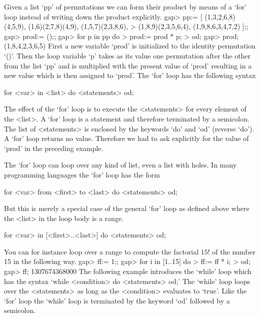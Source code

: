 \null

%
Given a list `pp' of permutations we can form their product by means of a
`for' loop instead of writing down the product explicitly.
\beginexample
    gap> pp:= [ (1,3,2,6,8)(4,5,9), (1,6)(2,7,8)(4,9), (1,5,7)(2,3,8,6),
    >           (1,8,9)(2,3,5,6,4), (1,9,8,6,3,4,7,2) ];;
    gap> prod:= ();;
    gap> for p in pp do
    >       prod:= prod * p;
    >    od;
    gap> prod;
    (1,8,4,2,3,6,5)
\endexample
First a  new variable `prod'  is initialized  to the identity permutation
`()'. Then the loop variable `p' takes as its value one permutation after
the other from the list `pp' and is multiplied with  the present value of
`prod'  resulting in a  new value which  is then assigned  to `prod'. The
`for' loop has the following syntax

\)\fmark for <var> in <list> do <statements> od;

The  effect of the `for'  loop  is to execute the <statements> for  every
element  of  the <list>.   A `for'  loop  is  a  statement  and therefore
terminated by a semicolon.  The list of <statements>  is enclosed by  the
keywords `do' and `od'  (reverse  `do').  A `for'  loop returns no value.
Therefore we had  to  ask  explicitly for  the  value  of  `prod' in  the
preceding example.

The `for' loop can loop over any kind of list, even a list with holes.
In many programming languages the `for' loop has the form

\)\fmark for <var> from <first> to <last> do <statements> od;

But this is merely a special case of the general `for' loop as defined
above where the <list> in the loop body is a range.

\)\fmark for <var> in [<first>..<last>] do <statements>  od;

You can for  instance loop over a range to compute the factorial $15!$
of the number 15 in the following way.
\beginexample
    gap> ff:= 1;;
    gap> for i in [1..15] do
    >       ff:= ff * i;
    >    od;
    gap> ff;
    1307674368000 
\endexample
The following  example introduces the  `while' loop which  has the syntax
`while <condition> do <statements>  od;' The `while'  loop loops over the
<statements>  as long as  the <condition> evaluates  to  `true'. Like the
`for' loop the `while' loop is terminated by the keyword `od' followed by
a semicolon.

